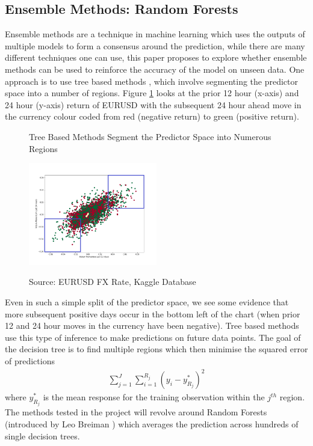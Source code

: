 \documentclass[11pt, a4paper]{article}
\begin{document}
\subsection{Ensemble Methods: Random Forests}
Ensemble methods are a technique in machine learning which uses the outputs of multiple models to form a consensus around the prediction, while there are many different techniques one can use, this paper proposes to explore whether ensemble methods can be used to reinforce the accuracy of the model on unseen data. One approach is to use tree based methods \cite{Podgorelec2015} , which involve segmenting the predictor space into a number of regions.  Figure \ref{fig:EURUSDMomentum} looks at the prior 12 hour (x-axis) and 24 hour (y-axis) return of EURUSD with the subsequent 24 hour ahead move in the currency colour coded from red (negative return) to green (positive return). 
\begin{figure}[h]
    \centering
	\caption{Tree Based Methods Segment the Predictor Space into Numerous Regions}    
	\includegraphics[width=0.5\textwidth]{EURUSDMomentum}
    \label{fig:EURUSDMomentum}
     \caption*{Source: EURUSD FX Rate, Kaggle Database}
\end{figure}
Even in such a simple split of the predictor space, we see some evidence that more subsequent positive days occur in the bottom left of the chart (when prior 12 and 24 hour moves in the currency have been negative). Tree based methods use this type of inference to make predictions on future data points. The goal of the decision tree is to find multiple regions which then minimise the squared error of predictions
\begin{align}
\sum^{J}_{j = 1}\sum^{R_{j}}_{i = 1} (y_{i}-y^{*}_{R_{j}})^{2} 
\end{align}
 where $y^{*}_{R_{j}}$ is the mean response for the training observation within the $j^{th}$ region.
The methods tested in the project will revolve around Random Forests (introduced by Leo Breiman \cite{Breiman2001}) which averages the prediction across hundreds of single decision trees. 
\end{document}
